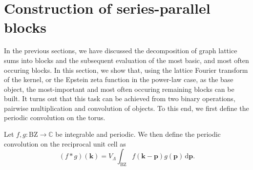 \documentclass[]{amsart}
\numberwithin{mythm}{section}
\begin{document}
\section{Construction of series-parallel blocks}
\label{sec:sp-construction}

In the previous sections, we have discussed the decomposition of graph lattice sums into blocks and the subsequent evaluation of the most basic, and most often occuring blocks. In this section, we show that, using the lattice Fourier transform of the kernel, or the Epstein zeta function in the power-law case, as the base object, the most-important  and most often occuring remaining blocks can be built. It turns out that this task can be achieved from two binary operations, pairwise multiplication and convolution of objects. To this end, we first define the periodic convolution on the torus.

\begin{definition}
    Let $f,g:\mathrm{BZ}\to \mathds C$ be integrable and periodic. We then define the periodic convolution on the reciprocal unit cell as
    \[
    (f\ast g)(\bm k) = V_\Lambda \int_{\mathrm{BZ}} f(\bm k-\bm p) g(\bm p)\,\mathrm d \bm p.
    \]
\end{definition}
\end{document}
